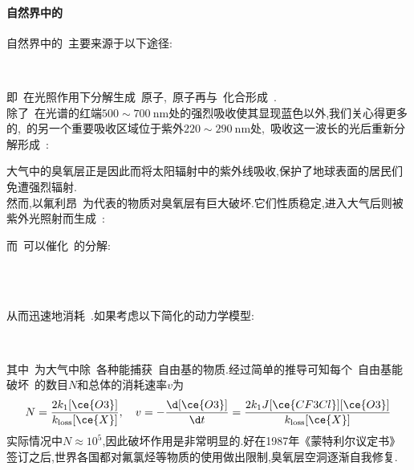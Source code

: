 \documentclass{ctexbook}
\begin{document}
\paragraph{自然界中的}自然界中的~主要来源于以下途径:
\begin{tightcenter}
    \\
\end{tightcenter}
即~在光照作用下分解生成~原子,~原子再与~化合形成~.\\
\indent 除了~在光谱的红端$500\sim\SI{700}{\nano\meter}$处的强烈吸收使其显现蓝色以外,我们关心得更多的,~的另一个重要吸收区域位于紫外$220\sim\SI{290}{\nano\meter}$处,~吸收这一波长的光后重新分解形成~:
\begin{tightcenter}
\end{tightcenter}
大气中的臭氧层正是因此而将太阳辐射中的紫外线吸收,保护了地球表面的居民们免遭强烈辐射.\\
\indent 然而,以氟利昂~为代表的物质对臭氧层有巨大破坏.它们性质稳定,进入大气后则被紫外光照射而生成~:
\begin{tightcenter}
\end{tightcenter}
而~可以催化~的分解:
\begin{tightcenter}
    \\
    \\
\end{tightcenter}
从而迅速地消耗~.如果考虑以下简化的动力学模型:
\begin{tightcenter}
    \qquad{}\\
    \qquad{}
\end{tightcenter}
其中~为大气中除~各种能捕获~自由基的物质.经过简单的推导可知每个~自由基能破坏~的数目$N$和总体的消耗速率$v$为
\[N=\dfrac{2k_1[\ce{O3}]}{k_{\text{loss}}[\ce{X}]},\quad v=-\dfrac{\d[\ce{O3}]}{\d t}=\dfrac{2k_1J[\ce{CF3Cl}][\ce{O3}]}{k_{\text{loss}}[\ce{X}]}\]
实际情况中$N\approx10^5$,因此破坏作用是非常明显的.好在1987年《蒙特利尔议定书》签订之后,世界各国都对氟氯烃等物质的使用做出限制,臭氧层空洞逐渐自我修复.
\end{document}
